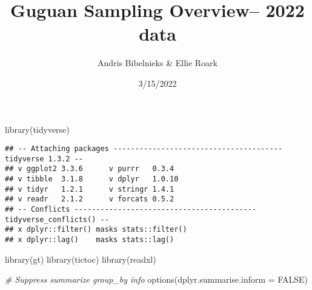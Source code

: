 \documentclass[
]{article}
\title{Guguan Sampling Overview-- 2022 data}
\author{Andris Bibelnieks \& Ellie Roark}
\date{3/15/2022}
\newenvironment{Shaded}{\begin{snugshade}}{\end{snugshade}}
\newcommand{\AttributeTok}[1]{\textcolor[rgb]{0.77,0.63,0.00}{#1}}
\newcommand{\CommentTok}[1]{\textcolor[rgb]{0.56,0.35,0.01}{\textit{#1}}}
\newcommand{\ConstantTok}[1]{\textcolor[rgb]{0.00,0.00,0.00}{#1}}
\newcommand{\FunctionTok}[1]{\textcolor[rgb]{0.00,0.00,0.00}{#1}}
\newcommand{\NormalTok}[1]{#1}
\begin{document}
\maketitle

\begin{Shaded}
\begin{Highlighting}[]
\FunctionTok{library}\NormalTok{(tidyverse)}
\end{Highlighting}
\end{Shaded}

\begin{verbatim}
## -- Attaching packages --------------------------------------- tidyverse 1.3.2 --
## v ggplot2 3.3.6      v purrr   0.3.4 
## v tibble  3.1.8      v dplyr   1.0.10
## v tidyr   1.2.1      v stringr 1.4.1 
## v readr   2.1.2      v forcats 0.5.2 
## -- Conflicts ------------------------------------------ tidyverse_conflicts() --
## x dplyr::filter() masks stats::filter()
## x dplyr::lag()    masks stats::lag()
\end{verbatim}

\begin{Shaded}
\begin{Highlighting}[]
\FunctionTok{library}\NormalTok{(gt)}
\FunctionTok{library}\NormalTok{(tictoc)}
\FunctionTok{library}\NormalTok{(readxl)}

\CommentTok{\# Suppress summarize group\_by info}
\FunctionTok{options}\NormalTok{(}\AttributeTok{dplyr.summarise.inform =} \ConstantTok{FALSE}\NormalTok{)}
\end{Highlighting}
\end{Shaded}
\end{document}
